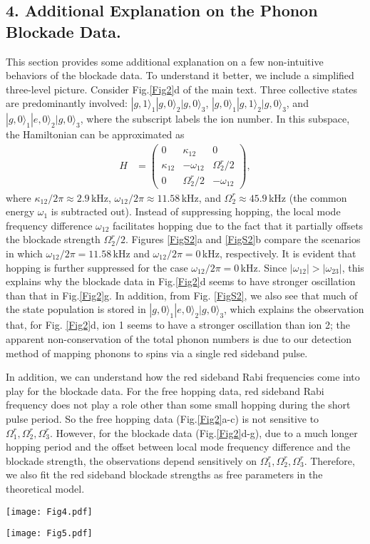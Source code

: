 \documentclass[groupaddress,9pt,twocolumn,superscriptaddress, aps, prl]{revtex4-1}
\newcommand{\ket}[1]{|#1\rangle}
\newcommand{\FigureFour}{
\begin{figure*}
\begin{center}
\texttt{[image: Fig4.pdf]}
\end{center}
\renewcommand{\baselinestretch}{1}
\small\normalsize
\caption{ Sideband spectroscopy of local phonon modes. (a) The blue sideband spectroscopy showing sideband transitions for the two transverse local modes of each ion in a chain of three. Each ion is Raman sideband-cooled to the motional ground state of both modes. A blue sideband $\pi-$pulse is then applied on each ion, which changes its state from $\ket{g,0}$ to $\ket{e,1}$ when resonant with a sideband transition. The two transverse local modes are sufficiently separated by $\approx 250\:$kHz compared to the sideband transition strength such that the mode with higher energy can be spectrally addressed for introducing local phonon excitations during the `preparation' step of an experimental sequence as shown in Fig. \ref{Fig1}b. (b) Red sideband spectroscopy of the higher energy transverse local mode. Each ion is initialized to $\ket{g,1}$ as shown in Fig. \ref{Fig1}b followed by a red sideband $\pi-$pulse that flips the state from $\ket{g,1}$ to $\ket{e,0}$ followed by measurement of the spin-up state $\ket{e}$ using state-dependent fluorescence. The red sideband Rabi frequencies obtained by fitting the data determines the strength of phonon blockade applied on each ion (see Fig. \ref{Fig1}a).}
\label{FigS1}
\end{figure*}}
\newcommand{\FigureFive}{
\begin{figure*}
\begin{center}
\texttt{[image: Fig5.pdf]}
\end{center}
\renewcommand{\baselinestretch}{1}
\small\normalsize
\caption{ A theoretical analysis of the effect of phonon blockade on ion 2 when an initial phonon excitation is introduced on ion 1. The analysis captures phonon hopping in terms of the time evolution of the states $\ket{g,1}_1\ket{g,0}_2\ket{g,0}_3$, $\ket{g,0}_1\ket{g,1}_2\ket{g,0}_3$, and $\ket{g,0}_1\ket{e,0}_2\ket{g,0}_3$, which are predominantly coupled to each other via the hopping and blockade interactions. (a) Shows the dynamics for real experimental conditions where $\omega_{12}/2\pi=11.58\:$kHz. This simulates experimental data in Fig. \ref{Fig2}d. (b) Shows the dynamics for the case where $\omega_{12}/2\pi=0\:$kHz which exhibits a higher suppression of hopping.}
\label{FigS2}
\end{figure*}}
\begin{document}
\subsection{4. Additional Explanation on the Phonon Blockade Data.}
This section provides some additional explanation on a few non-intuitive behaviors of the blockade data. To understand it better, we include a simplified three-level picture. Consider Fig.\ref{Fig2}d of the main text. Three collective states are predominantly involved: $\ket{g,1}_{1}\ket{g,0}_{2}\ket{g,0}_{3}$, $\ket{g,0}_{1}\ket{g,1}_{2}\ket{g,0}_{3}$, and $\ket{g,0}_{1}\ket{e,0}_{2}\ket{g,0}_{3}$, where the subscript labels the ion number. In this subspace, the Hamiltonian can be approximated as 
\begin{align}
H &= \left(\begin{array}{ccc}
0 & \kappa_{12} & 0 \\
\kappa_{12} & -\omega_{12} & \Omega_{2}^{r}/2 \\
0 & \Omega_{2}^{r}/2  & -\omega_{12}
\end{array}\right) ,
\label{Eq:3level}
\end{align}
where $\kappa_{12}/2\pi \approx 2.9\,$kHz, $\omega_{12}/2\pi \approx 11.58\,$kHz, and $\Omega_{2}^{r} \approx 45.9\,$kHz (the common energy $\omega_{1}$ is subtracted out). Instead of suppressing hopping, the local mode frequency difference $\omega_{12}$ facilitates hopping due to the fact that it partially offsets the blockade strength $\Omega_{2}^{r}/2$. Figures \ref{FigS2}a and \ref{FigS2}b compare the scenarios in which $\omega_{12}/2\pi = 11.58\,$kHz and $\omega_{12}/2\pi = 0\,$kHz, respectively. It is evident that hopping is further suppressed for the case $\omega_{12}/2\pi = 0\,$kHz. Since $|\omega_{12}| > |\omega_{23}| $, this explains why the blockade data in Fig.\ref{Fig2}d seems to have stronger oscillation than that in Fig.\ref{Fig2}g. In addition, from Fig. \ref{FigS2}, we also see that much of the state population is stored in $\ket{g,0}_{1}\ket{e,0}_{2}\ket{g,0}_{3}$, which explains the observation that, for Fig. \ref{Fig2}d, ion 1 seems to have a stronger oscillation than ion 2; the apparent non-conservation of the total phonon numbers is due to our detection method of mapping phonons to spins via a single red sideband pulse. 

In addition, we can understand how the red sideband Rabi frequencies come into play for the blockade data. For the free hopping data, red sideband Rabi frequency does not play a role other than some small hopping during the short pulse period. So the free hopping data (Fig.\ref{Fig2}a-c) is not sensitive to $\Omega_{1}^{r}, \Omega_{2}^{r}, \Omega_{3}^{r}$. However, for the blockade data (Fig.\ref{Fig2}d-g), due to a much longer hopping period and the offset between local mode frequency difference and the blockade strength, the observations depend sensitively on  $\Omega_{1}^{r}, \Omega_{2}^{r}, \Omega_{3}^{r}$. Therefore, we also fit the red sideband blockade strengths as free parameters in the theoretical model. 



\FigureFour
\FigureFive
\end{document}
